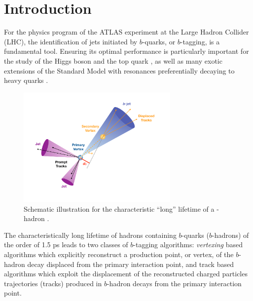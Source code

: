 \section{Introduction}
\label{sec:ftag-intro}

For the physics program of the ATLAS experiment at the Large Hadron Collider (LHC), the identification of jets initiated by $b$-quarks, or $b$-tagging, is a fundamental tool. 
Ensuring its optimal performance is particularly important for the study of the Higgs boson and the top quark \cite{HIGG-2018-04, HIGG-2018-13}, as well as many exotic extensions of the Standard Model with resonances preferentially decaying to heavy quarks \cite{ATLASdijetres}. 


\begin{figure}[htbp]
  \centering
  \includegraphics[width=0.7\textwidth]{figures/ftag/b-trig-paper/fig_01}
  \caption{Schematic illustration for the characteristic ``long'' lifetime of a \Pqb-hadron \cite{b-trig-paper}. }
  \label{fig:b-jet-graphic}
\end{figure}

The characteristically long lifetime of hadrons containing $b$-quarks ($b$-hadrons) of the order of 1.5 ps \cite{PDG} leads to two classes of $b$-tagging algorithms: \textit{vertexing} based algorithms which explicitly reconstruct a production point, or vertex, of the $b$-hadron decay displaced from the primary interaction point, and track based algorithms which exploit the displacement of the reconstructed charged particles trajectories (tracks) produced in $b$-hadron decays from the primary interaction point.


